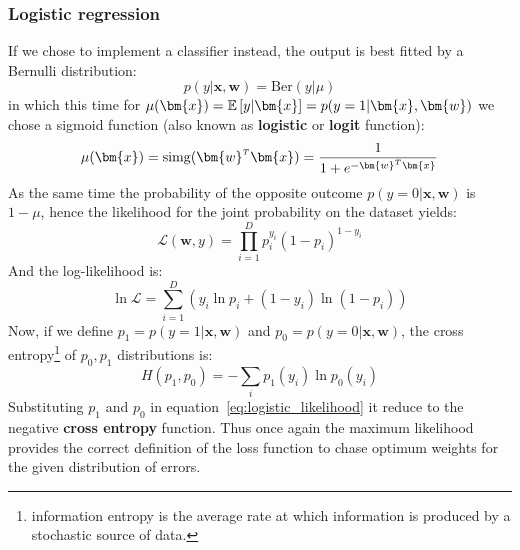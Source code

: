 

\subsubsection{Logistic regression}

If we chose to implement a classifier instead, the output is best fitted by a Bernulli distribution:
\begin{equation}
    p(y|\bm{x},\bm{w}) = \mathrm{Ber}(y|\mu)
\end{equation}
in which this time for $\mu(\bm{x}) = \expectation{y|\bm{x}} = p(y=1|\bm{x},\bm{w})$ we chose a sigmoid function (also known as \textbf{logistic} or \textbf{logit} function):
\begin{equation}
    \mu(\bm{x}) = \mathrm{simg}(\transpose{\bm{w}}\bm{x}) = \frac{1}{1+e^{-\transpose{\bm{w}}\bm{x}}}
\end{equation}
As the same time the probability of the opposite outcome $p(y=0|\bm{x},\bm{w})$ is $1-\mu$, hence the likelihood for the joint probability on the dataset yields:
\begin{equation}
    \mathcal{L}(\bm{w}, y) = \prod_{i=1}^D p_i^{y_i}(1-p_i)^{1-y_i}
\end{equation}
And the log-likelihood is:
\begin{equation}
    \ln\mathcal{L} = \sum_{i=1}^D (y_i \ln p_i + (1-y_i)\ln(1-p_i))
    \label{eq:logistic_likelihood}
\end{equation}
Now, if we define $p_1 = p(y=1|\bm{x},\bm{w})$ and $p_0 = p(y=0|\bm{x},\bm{w})$, the cross entropy\footnote{information entropy is the average rate at which information is produced by a stochastic source of data.} of $p_0,p_1$ distributions is:
\begin{equation}
    H(p_1,p_0) = - \sum_i p_1(y_i) \ln p_0(y_i)
\end{equation}
Substituting $p_1$ and $p_0$ in equation~\eqref{eq:logistic_likelihood} it reduce to the negative \textbf{cross entropy} function. Thus once again the maximum likelihood provides the correct definition of the loss function to chase optimum weights for the given distribution of errors.


%
